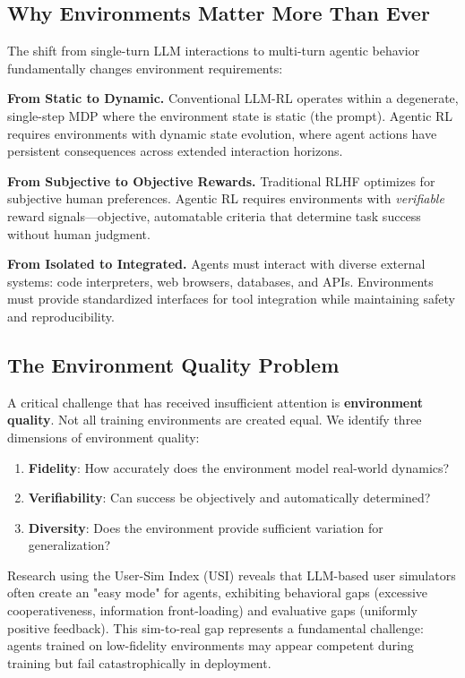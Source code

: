 \subsection{Why Environments Matter More Than Ever}

The shift from single-turn LLM interactions to multi-turn agentic behavior fundamentally changes environment requirements:

\textbf{From Static to Dynamic.} Conventional LLM-RL operates within a degenerate, single-step MDP where the environment state is static (the prompt). Agentic RL requires environments with dynamic state evolution, where agent actions have persistent consequences across extended interaction horizons.

\textbf{From Subjective to Objective Rewards.} Traditional RLHF optimizes for subjective human preferences. Agentic RL requires environments with \textit{verifiable} reward signals---objective, automatable criteria that determine task success without human judgment.

\textbf{From Isolated to Integrated.} Agents must interact with diverse external systems: code interpreters, web browsers, databases, and APIs. Environments must provide standardized interfaces for tool integration while maintaining safety and reproducibility.

\subsection{The Environment Quality Problem}

A critical challenge that has received insufficient attention is \textbf{environment quality}. Not all training environments are created equal. We identify three dimensions of environment quality:

\begin{enumerate}
    \item \textbf{Fidelity}: How accurately does the environment model real-world dynamics?
    \item \textbf{Verifiability}: Can success be objectively and automatically determined?
    \item \textbf{Diversity}: Does the environment provide sufficient variation for generalization?
\end{enumerate}

Research using the User-Sim Index (USI) reveals that LLM-based user simulators often create an "easy mode" for agents, exhibiting behavioral gaps (excessive cooperativeness, information front-loading) and evaluative gaps (uniformly positive feedback). This sim-to-real gap represents a fundamental challenge: agents trained on low-fidelity environments may appear competent during training but fail catastrophically in deployment.


